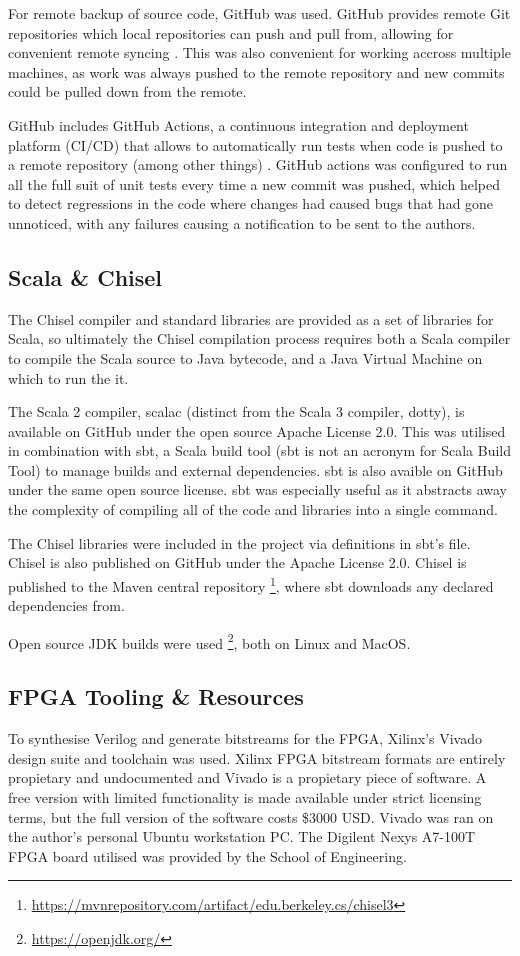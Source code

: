 For remote backup of source code, GitHub was used. GitHub provides remote Git repositories which local repositories can push and pull from, allowing for convenient remote syncing \cite{github}. This was also convenient for working accross multiple machines, as work was always pushed to the remote repository and new commits could be pulled down from the remote.

GitHub includes GitHub Actions, a continuous integration and deployment platform (CI/CD) that allows to automatically run tests when code is pushed to a remote repository (among other things) \cite{gha}. GitHub actions was configured to run all the full suit of unit tests every time a new commit was pushed, which helped to detect regressions in the code where changes had caused bugs that had gone unnoticed, with any failures causing a notification to be sent to the authors.

\subsection{Scala \& Chisel }

The Chisel compiler and standard libraries are provided as a set of libraries for Scala, so ultimately the Chisel compilation process requires both a Scala compiler to compile the Scala source to Java bytecode, and a Java Virtual Machine on which to run the it.

The Scala 2 compiler, scalac (distinct from the Scala 3 compiler, dotty), is available on GitHub under the open source Apache License 2.0. This was utilised in combination with sbt, a Scala build tool (sbt is not an acronym for Scala Build Tool) to manage builds and external dependencies. sbt is also avaible on GitHub under the same open source license. sbt was especially useful as it abstracts away the complexity of compiling all of the code and libraries into a single  command.

The Chisel libraries were included in the project via definitions in sbt's  file. Chisel is also published on GitHub under the Apache License 2.0. Chisel is published to the Maven central repository \footnote{\url{https://mvnrepository.com/artifact/edu.berkeley.cs/chisel3}}, where sbt downloads any declared dependencies from.

Open source JDK builds were used \footnote{\url{https://openjdk.org/}}, both on Linux and MacOS.

\subsection{FPGA Tooling \& Resources}

To synthesise Verilog and generate bitstreams for the FPGA, Xilinx's Vivado design suite and toolchain was used. Xilinx FPGA bitstream formats are entirely propietary and undocumented and Vivado is a propietary piece of software. A free version with limited functionality is made available under strict licensing terms, but the full version of the software costs \$3000 USD. Vivado was ran on the author's personal Ubuntu workstation PC. The Digilent Nexys A7-100T FPGA board utilised was provided by the School of Engineering.

